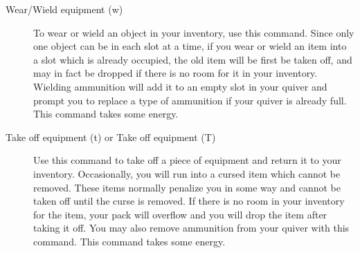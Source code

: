 \begin{description}
\item[Wear/Wield equipment (w)] To wear or wield an object in your
  inventory, use this command. Since only one object can be in each
  slot at a time, if you wear or wield an item into a slot which is
  already occupied, the old item will be first be taken off, and may
  in fact be dropped if there is no room for it in your inventory.
  Wielding ammunition will add it to an empty slot in your quiver and
  prompt you to replace a type of ammunition if your quiver is already
  full.  This command takes some energy.

\item[Take off equipment (t) or Take off equipment (T)] Use this command
  to take off a piece of equipment and return it to your inventory.
  Occasionally, you will run into a cursed item which cannot be
  removed.  These items normally penalize you in some way and cannot
  be taken off until the curse is removed. If there is no room in your
  inventory for the item, your pack will overflow and you will drop
  the item after taking it off. You may also remove ammunition from
  your quiver with this command. This command takes some energy.
\end{description}

